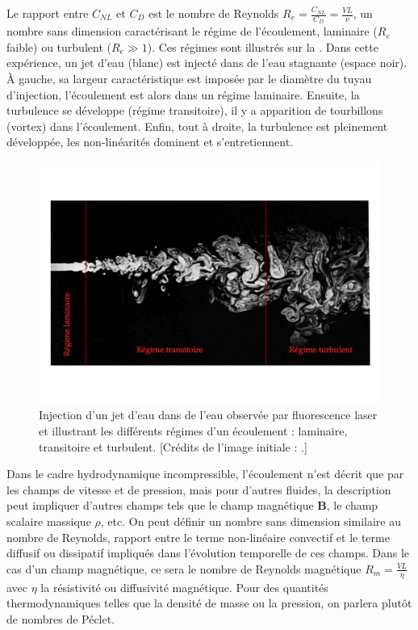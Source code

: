 Le rapport entre $C_{NL}$ et $C_D$ est le nombre de Reynolds $R_e = \frac{C_{NL}}{C_D} = \frac{VL}{\nu}$, un nombre sans dimension caractérisant le régime de l'écoulement, laminaire ($R_e$ faible) ou turbulent ($R_e \gg 1$). Ces régimes sont illustrés sur la . Dans cette expérience, un jet d'eau (blanc) est injecté dans de l'eau stagnante (espace noir). À gauche, sa largeur caractéristique est imposée par le diamètre du tuyau d'injection, l'écoulement est alors dans un régime laminaire. Ensuite, la turbulence se développe (régime transitoire), il y a apparition de tourbillons (vortex) dans l'écoulement. Enfin, tout à droite, la turbulence est pleinement développée, les non-linéarités dominent et s'entretiennent.
\begin{figure}[!ht]
 \centering
\includegraphics[width=\linewidth,trim=1cm 3cm 1cm 3cm, clip=true]{./Part_0/images/turbul_Re}
\cprotect\caption{Injection d'un jet d'eau dans de l'eau observée par fluorescence laser et illustrant les différents régimes d'un écoulement : laminaire, transitoire et turbulent. [Crédits de l'image initiale : \cite{van_dyke_album_1982}.]}
\label{fig:ecoulement}
\end{figure}

Dans le cadre hydrodynamique incompressible, l'écoulement n'est décrit que par les champs de vitesse et de pression, mais pour d'autres fluides, la description peut impliquer d'autres champs tels que le champ magnétique $\boldsymbol{B}$, le champ scalaire massique $\rho$, etc. On peut définir un nombre sans dimension similaire au nombre de Reynolds, rapport entre le terme non-linéaire convectif et le terme diffusif ou dissipatif impliqués dans l'évolution temporelle de ces champs. Dans le cas d'un champ magnétique, ce sera le nombre de Reynolds magnétique $R_m = \frac{VL}{\eta}$ avec $\eta$ la résistivité ou diffusivité magnétique. Pour des quantités thermodynamiques telles que la densité de masse ou la pression, on parlera plutôt de nombres de Péclet.

